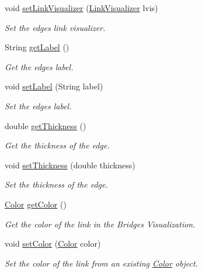 \begin{DoxyCompactItemize}
\item 
void \hyperlink{classbridges_1_1base_1_1_edge_a1bb8008507d26245468bf9d0f1452072}{set\+Link\+Visualizer} (\hyperlink{classbridges_1_1base_1_1_link_visualizer}{Link\+Visualizer} lvis)
\begin{DoxyCompactList}\small\item\em Set the edge\textquotesingle{}s link visualizer. \end{DoxyCompactList}\item 
String \hyperlink{classbridges_1_1base_1_1_edge_a8663708d930e8df460c57d8bdbab44b2}{get\+Label} ()
\begin{DoxyCompactList}\small\item\em Get the edge\textquotesingle{}s label. \end{DoxyCompactList}\item 
void \hyperlink{classbridges_1_1base_1_1_edge_ad5f1d55a3c8caeb975f497dfe4f29242}{set\+Label} (String label)
\begin{DoxyCompactList}\small\item\em Set the edge\textquotesingle{}s label. \end{DoxyCompactList}\item 
double \hyperlink{classbridges_1_1base_1_1_edge_a3431e83235fc5d5dd5cf747ed4853881}{get\+Thickness} ()
\begin{DoxyCompactList}\small\item\em Get the thickness of the edge. \end{DoxyCompactList}\item 
void \hyperlink{classbridges_1_1base_1_1_edge_ae8d87539f03f04479e5f5710ea9bf260}{set\+Thickness} (double thickness)
\begin{DoxyCompactList}\small\item\em Set the thickness of the edge. \end{DoxyCompactList}\item 
\hyperlink{classbridges_1_1base_1_1_color}{Color} \hyperlink{classbridges_1_1base_1_1_edge_a243d9e6a57ebb570dda81bffe0cd4b77}{get\+Color} ()
\begin{DoxyCompactList}\small\item\em Get the color of the link in the Bridges Visualization. \end{DoxyCompactList}\item 
void \hyperlink{classbridges_1_1base_1_1_edge_a77f6d36e94a3cbb8e478c85a1a6dad84}{set\+Color} (\hyperlink{classbridges_1_1base_1_1_color}{Color} color)
\begin{DoxyCompactList}\small\item\em Set the color of the link from an existing \hyperlink{classbridges_1_1base_1_1_color}{Color} object. \end{DoxyCompactList}\item 

\end{DoxyCompactItemize}
